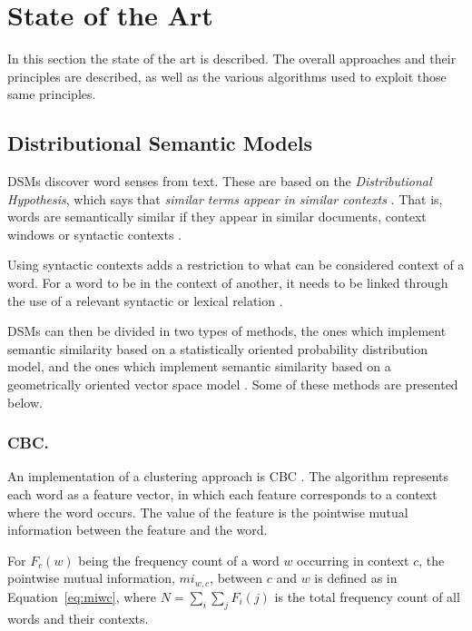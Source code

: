 \chapter{State of the Art}
\label{sec:stateofart}

In this section the state of the art is described. The overall approaches and
their principles are described, as well as the various algorithms used to
exploit those same principles.

\section{Distributional Semantic Models}

\acp{DSM} discover word senses from text. These are based on the
\textit{Distributional Hypothesis}, which says that \textit{similar terms
appear in similar contexts} \cite{curran2004distributional}. That is, words are
semantically similar if they appear in similar documents, context windows or
syntactic contexts \cite{van2010mining}.

Using syntactic contexts adds a restriction to what can be considered context of
a word. For a word to be in the context of another, it needs to be linked
through the use of a relevant syntactic or lexical relation
\cite{baroni2010distributional}.

\acp{DSM} can then be divided in two types of methods, the ones which implement
semantic similarity based on a statistically oriented probability distribution
model, and the ones which implement semantic similarity based on a geometrically
oriented vector space model \cite{van2010mining}. Some of these methods are
presented below.

\subsection{CBC.}

An implementation of a clustering approach is \ac{CBC}
\cite{pantel2003clustering,pantel2002discovering}. The algorithm represents each
word as a feature vector, in which each feature corresponds to a context where
the word occurs. The value of the feature is the pointwise mutual information
between the feature and the word.

For $F_c(w)$ being the frequency count of a word $w$ occurring in context $c$,
the pointwise mutual information, $mi_{w,c}$, between $c$ and $w$ is defined as
in Equation~\ref{eq:miwc}, where $N = \sum_i\sum_jF_i(j)$ is the total
frequency count of all words and their contexts.

